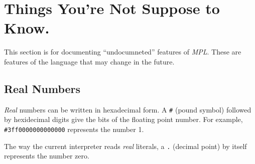 \documentclass{article}
\begin{document}
\section{Things You're Not Suppose to Know.}
This section is for documenting ``undocumneted'' features of \emph{MPL}.
These are features of the language that may change in the future.
\subsection{Real Numbers}
\emph{Real} numbers can be written in hexadecimal form.
A \verb|#| (pound symbol) followed by hexidecimal digits give the bits
of the floating point number. For example, \verb|#3ff0000000000000|
represents the number 1.

The way the current interpreter reads \emph{real} literals,
a \verb|.| (decimal point) by itself represents the number
zero.
\end{document}
